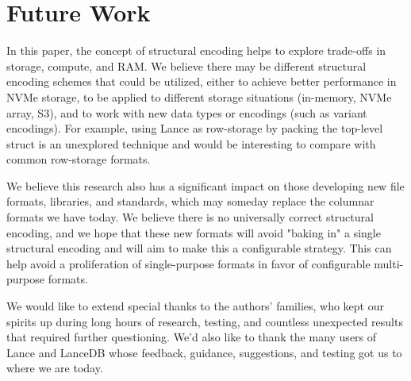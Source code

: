 \documentclass[sigconf, nonacm]{acmart}
\begin{document}
\section{Future Work}

In this paper, the concept of structural encoding helps to explore trade-offs in storage, compute, and RAM.  We believe there may be different structural encoding schemes that could be utilized, either to achieve better performance in NVMe storage, to be applied to different storage situations (in-memory, NVMe array, S3), and to work with new data types or encodings (such as variant encodings).  For example, using Lance as row-storage by packing the top-level struct is an unexplored technique and would be interesting to compare with common row-storage formats.

We believe this research also has a significant impact on those developing new file formats, libraries, and standards, which may someday replace the columnar formats we have today.  We believe there is no universally correct structural encoding, and we hope that these new formats will avoid "baking in" a single structural encoding and will aim to make this a configurable strategy.  This can help avoid a proliferation of single-purpose formats in favor of configurable multi-purpose formats.

\begin{acks}
 We would like to extend special thanks to the authors' families, who kept our spirits up during long hours of research, testing, and countless unexpected results that required further questioning.  We'd also like to thank the many users of Lance and LanceDB whose feedback, guidance, suggestions, and testing got us to where we are today.
\end{acks}


\balance


\end{document}

